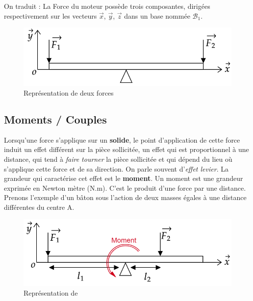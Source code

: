 \documentclass[
	11pt, %
	fleqn, %
	a4paper, %
]{LegrandOrangeBook}
\begin{document}
On traduit : La Force du moteur possède trois composantes, dirigées respectivement sur les vecteurs $\Vec{x}$, $\Vec{y}$, $\Vec{z}$ dans un base nommée $\mathcal{B}_{1}$.


\begin{figure}[H]  %
	\centering %
	\includegraphics[width=1\textwidth]{Images/Force1.png} %
    \caption{Représentation de deux forces}
	\label{Force1} %
\end{figure}


\subsection{Moments / Couples}
Lorsqu’une force s’applique sur un \textbf{solide}, le point d’application de cette force induit un effet différent sur la pièce sollicitée, un effet qui est proportionnel à une distance, qui tend à \textit{faire tourner} la pièce sollicitée et qui dépend du lieu où s’applique cette force et de sa direction. On parle souvent d’\textit{effet levier}. La grandeur qui caractérise cet effet est le \textbf{moment}.
Un moment est une grandeur exprimée en Newton mètre (N.m). C’est le produit d’une force par une distance.
Prenons l’exemple d’un bâton sous l’action de deux masses égales à une distance différentes du centre A.

\begin{figure}[H]  %
	\centering %
	\includegraphics[width=1\textwidth]{Images/Moment1.png} %
    \caption{Représentation de }
	\label{Moment1} %
\end{figure}
\end{document}
